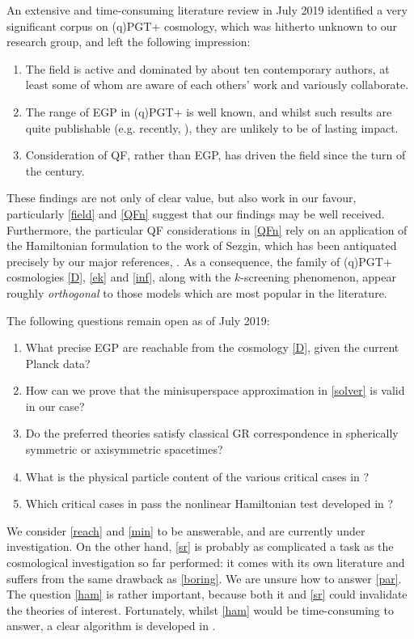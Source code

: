 \documentclass[twoside]{report}
\begin{document}
\begin{multicols}{2}
An extensive and time-consuming literature review in July 2019 identified a very significant corpus on (q)PGT+ cosmology, which was hitherto unknown to our research group, and left the following impression:
\begin{enumerate}[resume]
  \item\label{field} The field is active and dominated by about ten contemporary authors, at least some of whom are aware of each others' work and variously collaborate.
  \item\label{boring} The range of EGP in (q)PGT+ is well known, and whilst such results are quite publishable (e.g. recently, \cite{2019arXiv190604340Z}), they are unlikely to be of lasting impact.
  \item\label{QFn} Consideration of QF, rather than EGP, has driven the field since the turn of the century.
\end{enumerate}
These findings are not only of clear value, but also work in our favour, particularly \ref{field} and \ref{QFn} suggest that our findings may be well received. Furthermore, the particular QF considerations in \ref{QFn} rely \cite{2011PhRvD..83b4001B} on an application of the Hamiltonian formulation to the work of Sezgin, which has been antiquated precisely by our major references, \cite{2019PhRvD..99f4001L,Lin2}. As a consequence, the family of (q)PGT+ cosmologies \ref{D}, \ref{ek} and \ref{inf}, along with the $k$-screening phenomenon, appear roughly \textit{orthogonal} to those models which are most popular in the literature.

The following questions remain open as of July 2019:
\begin{enumerate}[resume]
  \item\label{reach} What precise EGP are reachable from the cosmology \ref{D}, given the current Planck data?
  \item\label{min} How can we prove that the minisuperspace approximation in \ref{solver} is valid in our case?
  \item\label{sr} Do the preferred theories satisfy classical GR correspondence in spherically symmetric or axisymmetric spacetimes?
  \item\label{par} What is the physical particle content of the various critical cases in \cite{2019PhRvD..99f4001L,Lin2}?
  \item\label{ham} Which critical cases in \cite{2019PhRvD..99f4001L,Lin2} pass the nonlinear Hamiltonian test developed in \cite{1999IJMPD...8..459Y,2002IJMPD..11..747Y}?
\end{enumerate}
We consider \ref{reach} and \ref{min} to be answerable, and are currently under investigation. On the other hand, \ref{sr} is probably as complicated a task as the cosmological investigation so far performed: it comes with its own literature and suffers from the same drawback as \ref{boring}. We are unsure how to answer \ref{par}. The question \ref{ham} is rather important, because both it and \ref{sr} could invalidate the theories of interest. Fortunately, whilst \ref{ham} would be time-consuming to answer, a clear algorithm is developed in \cite{1999IJMPD...8..459Y,2002IJMPD..11..747Y}.


\end{multicols}
\end{document}
